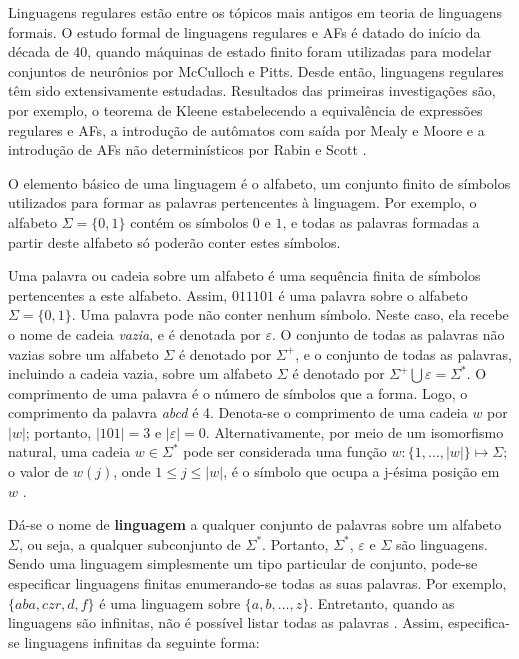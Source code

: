 \documentclass[12pt,a4paper]{article}
\begin{document}
Linguagens regulares estão entre os tópicos mais antigos em teoria de
linguagens formais. O estudo formal de linguagens regulares
e AFs é datado do início da década de 40, quando máquinas
de estado finito foram utilizadas para modelar conjuntos de neurônios
por McCulloch e Pitts. Desde então, linguagens regulares têm sido
extensivamente estudadas. Resultados das primeiras investigações são,
por exemplo, o teorema de Kleene estabelecendo a equivalência de
expressões regulares e AFs, a introdução de autômatos
com saída por Mealy e Moore e a introdução de AFs não
determinísticos por Rabin e Scott .

O elemento básico de uma linguagem é o alfabeto, um conjunto finito de símbolos
utilizados para formar as palavras pertencentes à linguagem. Por exemplo, o
alfabeto $\Sigma = \{0,1\}$ contém os símbolos $0$ e $1$, e todas as palavras
formadas a partir deste alfabeto só poderão conter estes símbolos.

Uma palavra ou cadeia sobre um alfabeto é uma sequência finita de símbolos
pertencentes a este alfabeto. Assim, $011101$ é uma palavra sobre o alfabeto
$\Sigma = \{0, 1\}$. Uma palavra pode não conter nenhum símbolo. Neste caso,
ela recebe o nome de cadeia \textit{vazia}, e é denotada por $\varepsilon$.
O conjunto de todas as palavras não vazias sobre um alfabeto $\Sigma$ é
denotado por $\Sigma^+$, e o conjunto de todas as palavras, incluindo
a cadeia vazia, sobre um alfabeto $\Sigma$ é denotado por
${\Sigma}^+ \bigcup \varepsilon = \Sigma^*$. O comprimento de uma palavra
é o número de símbolos que a forma. Logo, o comprimento da palavra
\emph{abcd} é 4. Denota-se o comprimento de uma cadeia $w$ por
$|w|$; portanto, $|101| = 3$ e $|\varepsilon| = 0$. Alternativamente,
por meio de um isomorfismo natural, uma cadeia $w \in \Sigma^*$ pode ser
considerada uma função $w: \{1,\ldots,|w|\} \mapsto \Sigma$; o
valor de $w(j)$, onde $1 \le j \le |w|$, é o símbolo que ocupa a j-ésima
posição em $w$ .

Dá-se o nome de \textbf{linguagem} a qualquer conjunto de palavras sobre um
alfabeto $\Sigma$, ou seja, a qualquer subconjunto de $\Sigma^*$. Portanto,
$\Sigma^*$, $\varepsilon$ e $\Sigma$ são linguagens. Sendo uma linguagem 
simplesmente um tipo particular de conjunto, pode-se especificar linguagens
finitas enumerando-se todas as suas palavras. Por exemplo, $\{aba, czr, d, f\}$
é uma linguagem sobre $\{a, b, \ldots, z\}$. Entretanto, quando as
linguagens são infinitas, não é possível listar todas as palavras
. Assim, especifica-se linguagens infinitas da seguinte forma:
\end{document}
